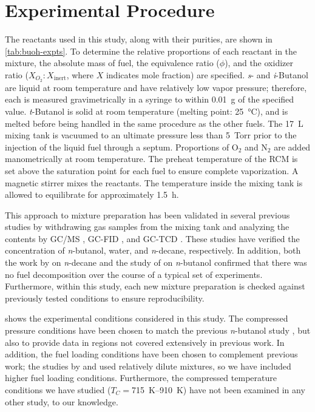 \documentclass[12pt, letterpaper]{article}
\begin{document}
\section{Experimental Procedure}
\label{sec:buoh-proc}

The reactants used in this study, along with their purities, are shown in
\autoref{tab:buoh-expts}. To determine the relative proportions of each
reactant in the mixture, the absolute mass of fuel, the equivalence ratio
($\phi$), and the oxidizer ratio ($X_{O_2}:X_{\mathrm{inert}}$, where $X$
indicates mole fraction) are specified. \textit{s}- and \textit{i}-Butanol are
liquid at room temperature and have relatively low vapor pressure; therefore,
each is measured gravimetrically in a syringe to within \SI{0.01}{g} of the specified
value. \textit{t}-Butanol is solid at room temperature (melting point: \SI{25}{\celsius}),
and is melted before being handled in the same procedure as the other fuels.
The \SI{17}{\liter} mixing tank is vacuumed to an ultimate pressure less than \SI{5}{Torr} prior
to the injection of the liquid fuel through a septum. Proportions of O$_2$ and
N$_2$ are added manometrically at room temperature. The preheat temperature of
the RCM is set above the saturation point for each fuel to ensure complete
vaporization. A magnetic stirrer mixes the reactants. The temperature inside
the mixing tank is allowed to equilibrate for approximately \SI{1.5}{\hour}.

This approach to mixture preparation has been validated in several previous
studies by withdrawing gas samples from the mixing tank and analyzing the
contents by GC/MS \cite{Weber2011}, GC-FID \cite{Kumar2009}, and GC-TCD
\cite{Das2012}. These studies have verified the concentration of
\textit{n}-butanol, water, and \textit{n}-decane, respectively. In addition,
both the work by \textcite{Kumar2009} on \textit{n}-decane and the study of
\textcite{Weber2011} on \textit{n}-butanol confirmed that there was no fuel
decomposition over the course of a typical set of experiments. Furthermore,
within this study, each new mixture preparation is checked against previously
tested conditions to ensure reproducibility.

 shows the experimental conditions considered in this
study. The compressed pressure conditions have been chosen to match the
previous \textit{n}-butanol study \cite{Weber2011}, but also to provide data in
regions not covered extensively in previous work. In addition, the fuel loading
conditions have been chosen to complement previous work; the studies by
\textcite{Stranic2012} and \textcite{Moss2008} used relatively dilute mixtures,
so we have included higher fuel loading conditions. Furthermore, the compressed
temperature conditions we have studied ($T_C=$\SIrange{715}{910}{\kelvin}) have not been examined
in any other study, to our knowledge.
\end{document}
